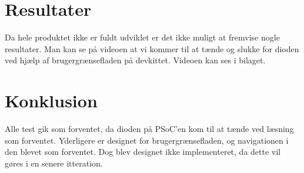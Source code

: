 \section*{Resultater}

Da hele produktet ikke er fuldt udviklet er det ikke muligt at fremvise nogle resultater. Man kan se på videoen at vi kommer til at tænde og slukke for dioden ved hjælp af brugergrænsefladen på devkittet. Videoen kan ses i bilaget.

\section{Konklusion}

Alle test gik som forventet, da dioden på PSoC'en kom til at tænde ved læsning som forventet. Yderligere er designet for brugergrænsefladen, og navigationen i den blevet som forventet. Dog blev designet ikke implementeret, da dette vil gøres i en senere itteration.